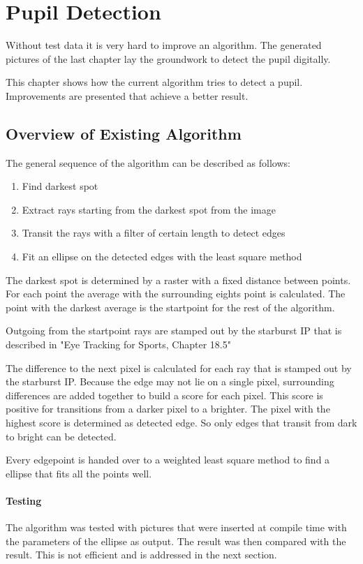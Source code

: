 \chapter{Pupil Detection}
\label{chap:pupildetection}
 Without test data it is very hard to improve an algorithm. The generated pictures of the last chapter lay the groundwork to detect the pupil digitally.
 
 This chapter shows how the current algorithm tries to detect a pupil. Improvements are presented that achieve a better result. 
\section{Overview of Existing Algorithm}
The general sequence of the algorithm can be described as follows:
\begin{enumerate}
	\item Find darkest spot
	\item Extract rays  starting from the darkest spot from the image
	\item Transit the rays with a filter of certain length to detect edges
	\item Fit an ellipse on the detected edges with the least square method
\end{enumerate}
The darkest spot is determined by a raster with a fixed distance between points. For each point the average with the surrounding eights point is calculated. The point with the darkest average is the startpoint for the rest of the algorithm.

Outgoing from the startpoint rays are stamped out by the starburst IP that is described in "Eye Tracking for Sports, Chapter 18.5" 

The difference to the next pixel is calculated for each ray that is stamped out by the starburst IP. Because the edge may not lie on a single pixel, surrounding differences are added together to build a score for each pixel. This score is positive for transitions from a darker pixel to a brighter. The pixel with the highest score is determined as detected edge. So only edges that transit from dark to bright can be detected.

Every edgepoint is handed over to a weighted least square method to find a ellipse that fits all the points well.
\subsubsection{Testing}
The algorithm was tested with pictures that were inserted at compile time with the parameters of the ellipse as output. The result was then compared with the result. This is not efficient and is addressed in the next section.
